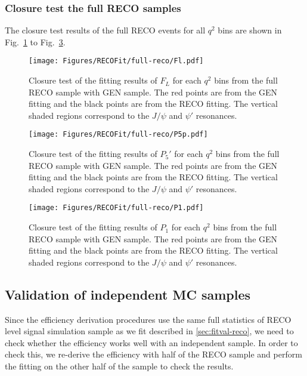 \clearpage

\subsubsection{Closure test  the full RECO samples}
\label{sec:fitval-closure-full}

The closure test results of the full  RECO events for all
$q^2$ bins are shown in Fig.~\ref{fig:fullreco-closure-fl} to
Fig.~\ref{fig:fullreco-closure-p1}.

\begin{figure}[!hbt]
  \centering
  \texttt{[image: Figures/RECOFit/full-reco/Fl.pdf]}
  \caption{Closure test of the fitting results of $F_L$ for each $q^2$
    bins from the full RECO sample with GEN sample.  The red points are
    from the GEN fitting and the black points are from the RECO
    fitting. The vertical shaded regions correspond to the $J/\psi$ and $\psi'$ resonances. }
  \label{fig:fullreco-closure-fl}
\end{figure}


\begin{figure}[!hbt]
  \centering
  \texttt{[image: Figures/RECOFit/full-reco/P5p.pdf]}
  \caption{Closure test of the fitting results of $P_5'$ for each $q^2$
    bins from the full RECO sample with GEN sample.  The red points are
    from the GEN fitting and the black points are from the RECO
    fitting. The vertical shaded regions correspond to the $J/\psi$ and $\psi'$ resonances. }
  \label{fig:fullreco-closure-p5p}
\end{figure}


\begin{figure}[!hbt]
  \centering
  \texttt{[image: Figures/RECOFit/full-reco/P1.pdf]}
  \caption{Closure test of the fitting results of $P_1$ for each $q^2$
    bins from the full RECO sample with GEN sample.  The red points are
    from the GEN fitting and the black points are from the RECO
    fitting. The vertical shaded regions correspond to the $J/\psi$ and $\psi'$ resonances. }
  \label{fig:fullreco-closure-p1}
\end{figure}

\clearpage
\subsection{Validation of independent MC samples}
\label{sec:fitval-half}

Since the efficiency derivation procedures use the same full
statistics of RECO level signal simulation sample as we fit
described in \ref{sec:fitval-reco}, we need to check whether the
efficiency works well with an independent sample. In order to check
this, we re-derive the efficiency with half of the RECO sample and
perform the fitting on the other half of the sample to check the
results.

